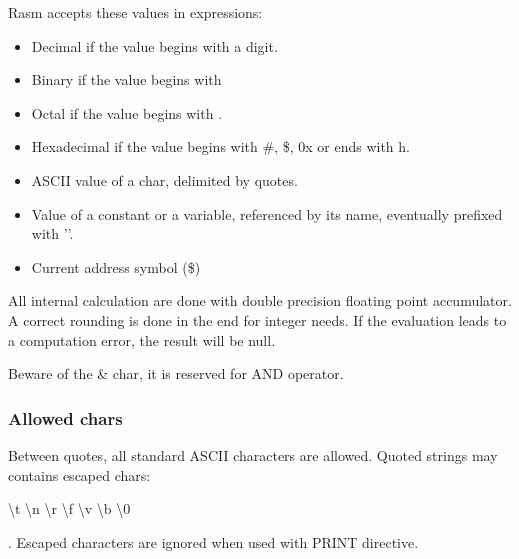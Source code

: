 \begin{xen}
Rasm accepts these values in expressions:
\begin{itemize}
  \item Decimal if the value begins with a digit.
  \item Binary if the value begins with %
  \item Octal if the value begins with \at.
  \item Hexadecimal if the value begins with \#, \$, 0x or ends with h.
  \item ASCII value of a char, delimited by quotes.
  \item Value of a constant or a variable, referenced by its name, eventually prefixed with '\at'.
  \item Current address symbol (\$)  
\end{itemize}

All internal calculation are done with double precision floating point accumulator. 
A correct rounding is done in the end for integer needs.
If the evaluation leads to a computation error, the result will be null.

Beware of the \& char, it is reserved for AND operator.

\subsubsection{Allowed chars}
Between quotes, all standard ASCII characters are allowed. 
Quoted strings may contains escaped chars: \begin{ttfamily} \textbackslash t \textbackslash n  \textbackslash r \textbackslash f \textbackslash v \textbackslash b \textbackslash 0 \end{ttfamily}.
Escaped characters are ignored when used with PRINT directive.


\end{xen}

\subsection{}

